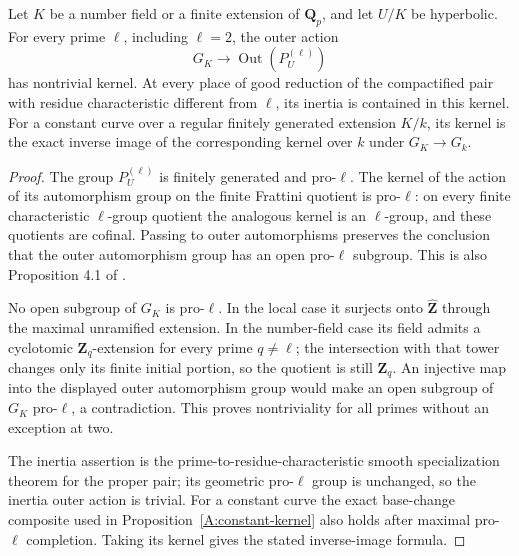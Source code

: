 \begin{proposition}
\label{A:proprime-kernels}
Let $K$ be a number field or a finite extension of
$\mathbf Q_p$, and let $U/K$ be hyperbolic. For every prime
$\ell$, including $\ell=2$, the outer action
\[
 G_K\longrightarrow\operatorname{Out}(P_U^{(\ell)})
\]
has nontrivial kernel. At every place of good reduction of
the compactified pair with residue characteristic different
from $\ell$, its inertia is contained in this kernel.
For a constant curve over a regular finitely generated
extension $K/k$, its kernel is the exact inverse image of
the corresponding kernel over $k$ under $G_K\to G_k$.
\end{proposition}
\begin{proof}
The group $P_U^{(\ell)}$ is finitely generated and pro-$\ell$.
The kernel of the action of its automorphism group on the
finite Frattini quotient is pro-$\ell$: on every finite
characteristic $\ell$-group quotient the analogous kernel is
an $\ell$-group, and these quotients are cofinal. Passing to
outer automorphisms preserves the conclusion that the outer
automorphism group has an open pro-$\ell$ subgroup. This is
also Proposition 4.1 of \cite{A_Mochizuki2006}.

No open subgroup of $G_K$ is pro-$\ell$. In the local case
it surjects onto $\widehat{\mathbf Z}$ through the maximal
unramified extension. In the number-field case its field
admits a cyclotomic $\mathbf Z_q$-extension for every prime
$q\ne\ell$; the intersection with that tower changes only
its finite initial portion, so the quotient is still
$\mathbf Z_q$. An injective map into the displayed outer
automorphism group would make an open subgroup of $G_K$
pro-$\ell$, a contradiction. This proves nontriviality for
all primes without an exception at two.

The inertia assertion is the prime-to-residue-characteristic
smooth specialization theorem for the proper pair; its
geometric pro-$\ell$ group is unchanged, so the inertia
outer action is trivial. For a constant curve the exact
base-change composite used in Proposition~\ref{A:constant-kernel}
also holds after maximal pro-$\ell$ completion. Taking its
kernel gives the stated inverse-image formula.
\end{proof}

